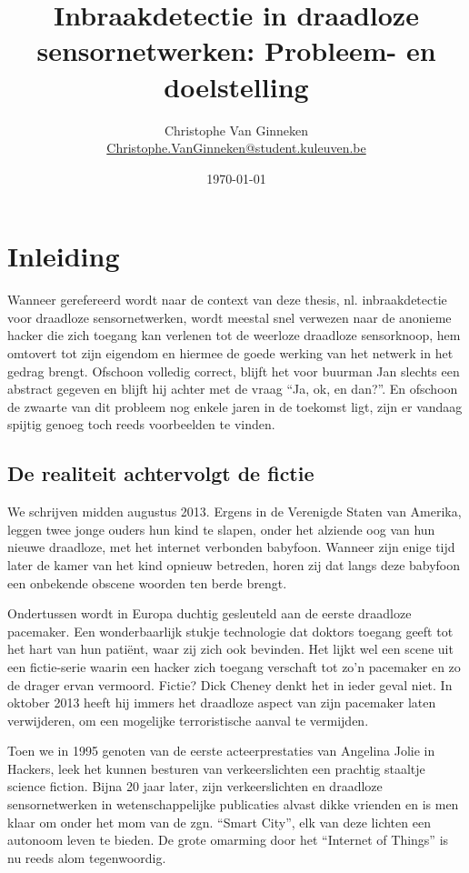 \documentclass[12pt,a4paper]{article}
\author{Christophe Van Ginneken\\\url{Christophe.VanGinneken@student.kuleuven.be}}
\title{Inbraakdetectie in draadloze sensornetwerken: Probleem- en doelstelling}
\date{\today}
\begin{document}
\maketitle

\section*{Inleiding}

Wanneer gerefereerd wordt naar de context van deze thesis, nl. inbraakdetectie
voor draadloze sensornetwerken, wordt meestal snel verwezen naar de anonieme
hacker die zich toegang kan verlenen tot de weerloze draadloze sensorknoop, hem
omtovert tot zijn eigendom en hiermee de goede werking van het netwerk in het
gedrag brengt. Ofschoon volledig correct, blijft het voor buurman Jan slechts
een abstract gegeven en blijft hij achter met de vraag ``Ja, ok, en dan?''. En
ofschoon de zwaarte van dit probleem nog enkele jaren in de toekomst ligt, zijn
er vandaag spijtig genoeg toch reeds voorbeelden te vinden.

\subsection*{De realiteit achtervolgt de fictie}

We schrijven midden augustus 2013. Ergens in de Verenigde Staten van Amerika,
leggen twee jonge ouders hun kind te slapen, onder het alziende oog van hun
nieuwe draadloze, met het internet verbonden babyfoon. Wanneer zijn enige tijd
later de kamer van het kind opnieuw betreden, horen zij dat langs deze babyfoon
een onbekende obscene woorden ten berde brengt.

Ondertussen wordt in Europa duchtig gesleuteld aan de eerste draadloze
pacemaker. Een wonderbaarlijk stukje technologie dat doktors toegang geeft tot
het hart van hun pati\"ent, waar zij zich ook bevinden. Het lijkt wel een scene
uit een fictie-serie waarin een hacker zich toegang verschaft tot zo'n
pacemaker en zo de drager ervan vermoord. Fictie? Dick Cheney denkt het in
ieder geval niet. In oktober 2013 heeft hij immers het draadloze aspect van
zijn pacemaker laten verwijderen, om een mogelijke terroristische aanval te
vermijden.

Toen we in 1995 genoten van de eerste acteerprestaties van Angelina Jolie in
Hackers, leek het kunnen besturen van verkeerslichten een prachtig staaltje
science fiction. Bijna 20 jaar later, zijn verkeerslichten en draadloze
sensornetwerken in wetenschappelijke publicaties alvast dikke vrienden en is
men klaar om onder het mom van de zgn. ``Smart City'', elk van deze lichten een
autonoom leven te bieden. De grote omarming door het ``Internet of Things'' is
nu reeds alom tegenwoordig.
\end{document}
